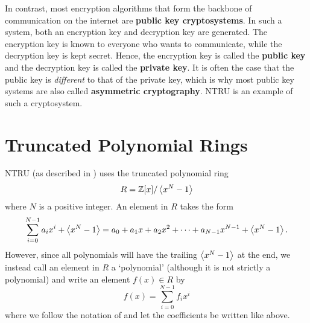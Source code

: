 In contrast, most encryption algorithms that form the backbone of communication on the internet are \textbf{public key cryptosystems}. In such a system, both an encryption key and decryption key are generated. The encryption key is known to everyone who wants to communicate, while the decryption key is kept secret. Hence, the encryption key is called the \textbf{public key} and the decryption key is called the \textbf{private key}. It is often the case that the public key is \textit{different} to that of the private key, which is why most public key systems are also called \textbf{asymmetric cryptography}. NTRU is an example of such a cryptosystem.

\section{Truncated Polynomial Rings}
NTRU (as described in \cite[\S 1.1]{hoffstein_pipher_silverman_1998}) uses the truncated polynomial ring
\[
    R = \mathbb{Z}[x] / \left\langle x^N - 1\right\rangle
\]
where $N$ is a positive integer. An element in $R$ takes the form
\[
    \sum_{i=0}^{N-1}a_ix^i + \left\langle x^N - 1\right\rangle = a_0 + a_1x + a_2x^2 + \cdots + a_{N-1}x^{N-1} + \left\langle x^N - 1\right\rangle.
\]
However, since all polynomials will have the trailing $\left\langle x^N - 1\right\rangle$ at the end, we instead call an element in $R$ a `polynomial' (although it is not strictly a polynomial) and write an element $f(x) \in R$ by
\[
    f(x) = \sum_{i=0}^{N-1}f_ix^i
\]
where we follow the notation of \cite{hoffstein_pipher_silverman_1996,hoffstein_pipher_silverman_1998} and let the coefficients be written like above.

